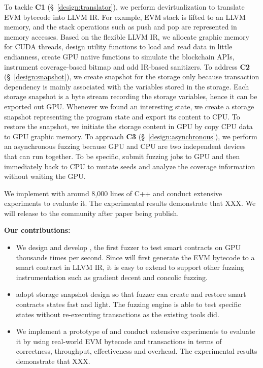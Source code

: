 To tackle \textbf{C1} (\S~\ref{design:translator}), we perform devirtualization to translate EVM bytecode into LLVM IR. For example, EVM stack is lifted to an LLVM memory, and the stack operations such as push and pop are represented in memory accesses. Based on the flexible LLVM IR, we allocate graphic memory for CUDA threads, design utility functions to load and read data in little endianness, create GPU native functions to simulate the blockchain APIs, instrument coverage-based bitmap and add IR-based sanitizers.
%
To address \textbf{C2} (\S~\ref{design:snapshot}), we create snapshot for the storage only because transaction dependency is mainly associated with the variables stored in the storage. 
Each storage snapshot is a byte stream recording the storage variables, hence it can be exported out GPU. 
Whenever we found an interesting state, we create a storage snapshot representing the program state and export its content to CPU. To restore the snapshot, we initiate the storage content in GPU by copy CPU data to GPU graphic memory.
%
To approach \textbf{C3} (\S~\ref{design:asynchronous}), we perform an asynchronous fuzzing because GPU and CPU are two independent devices that can run together. 
To be specific, {\tool} submit fuzzing jobs to GPU and then immediately back to CPU to mutate seeds and analyze the coverage information without waiting the GPU. 


We implement {\tool} with around 8,000 lines of C++ and conduct extensive experiments to evaluate it. 
The experimental results demonstrate that {\tool} XXX. 
We will release {\tool} to the community after paper being publish.



\noindent\textbf{Our contributions:}
\begin{itemize}
    \item We design and develop {\tool}, the first fuzzer to test smart contracts on GPU thousands times per second.
    Since {\tool} will first generate the EVM bytecode to a smart contract in LLVM IR, it is easy to extend {\tool} to support other fuzzing instrumentation such as gradient decent\cite{angora_sp} and concolic fuzzing\cite{symcc_sec}.
    \item {\tool} adopt storage snapshot design so that fuzzer can create and restore smart contracts states fast and light. The fuzzing engine is able to test specific states without re-executing transactions as the existing tools did.
    \item We implement a prototype of {\tool} and conduct extensive experiments to evaluate it by using real-world EVM bytecode and transactions in terms of correctness, throughput, effectiveness and overhead.
    The experimental results demonstrate that XXX.
\end{itemize}




 